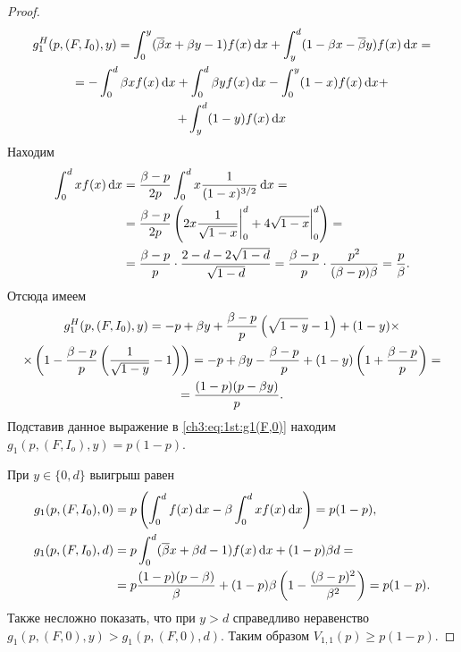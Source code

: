 {\begin{proof}
  \begin{equation*}
    \begin{gathered}
    g^H_1(p, (F, I_0), y) 
    =
    \int_0^y ({{\overline{\beta}}} x + \beta y - 1) f(x) \mathop{}\!\mathrm{d} x +
    \int_y^d (1 - \beta x - {{\overline{\beta}}} y) f(x) \mathop{}\!\mathrm{d} x = \\
    =
    - \int_0^d \beta x f(x) \mathop{}\!\mathrm{d} x +
    \int_0^d \beta y f(x) \mathop{}\!\mathrm{d} x -
    \int_0^y (1-x) f(x) \mathop{}\!\mathrm{d} x + \\
    + \int_y^d (1-y) f(x) \mathop{}\!\mathrm{d} x
    \end{gathered}
  \end{equation*}
  Находим
  \begin{equation}
    \label{ch3:eq:1st:f-exp}
    \begin{aligned}
      \int_0^d x f(x) \mathop{}\!\mathrm{d} x 
      &= \frac{\beta - p}{2 p} \int_0^d x \frac{1}{(1-x)^{3/2}} \mathop{}\!\mathrm{d} x = \\
      &= \frac{\beta - p}{2 p} \left( 
        2x \frac{1}{\sqrt{1-x}} \bigg|_0^d +
        4 \sqrt{1-x} \bigg|_0^d
      \right) = \\
      &= \frac{\beta - p}{p} \cdot \frac{2 - d - 2\sqrt{1-d}}{\sqrt{1-d}} =
      \frac{\beta - p}{p} \cdot \frac{p^2}{(\beta - p) \beta} = \frac{p}{\beta}.
    \end{aligned}
  \end{equation}
  Отсюда имеем
  \begin{gather*}
    g^H_1(p, (F, I_0), y) 
    = -p + \beta y +
    \frac{\beta - p}{p} \left( \sqrt{1-y} - 1 \right) +
    (1-y) \times \\
    \times \left( 1 - \frac{\beta - p}{p} \left( \frac{1}{\sqrt{1-y}} - 1 \right) \right) =
    -p + \beta y - \frac{\beta - p}{p} + (1-y) \left( 1 + \frac{\beta - p}{p} \right) = \\
    = \frac{(1-p)(p - \beta y)}{p}.
  \end{gather*}
  Подставив данное выражение в \eqref{ch3:eq:1st:g1(F,0)} находим $g_1(p, (F, I_o), y) = p (1-p)$.

  При $y \in \{0, d\}$ выигрыш равен
  \begin{align*}
    g_1(p, (F, I_0), 0) 
    &= p \left(\int_0^d f(x) \mathop{}\!\mathrm{d} x - \beta \int_0^d x f(x) \mathop{}\!\mathrm{d} x \right) =
      p(1-p),\\
    g_1(p, (F, I_0), d) 
    &=
      p \int_0^d ({{\overline{\beta}}} x + \beta d - 1) f(x) \mathop{}\!\mathrm{d} x + (1-p) \beta d = \\
    &= p \frac{(1-p)(p-\beta)}{\beta} +
      (1-p) \beta \left( 1 - \frac{(\beta - p)^2}{\beta^2} \right) = p(1-p).
  \end{align*}
  Также несложно показать, что при $y > d$ справедливо неравенство $g_1(p, (F, 0), y) > g_1(p, (F, 0), d)$.
  Таким образом $V_{1,1}(p) \geq p(1-p)$.
\end{proof}


}

